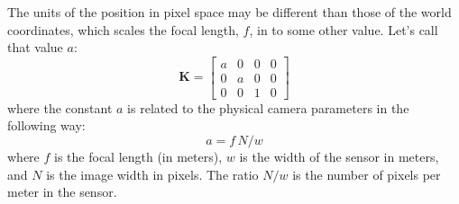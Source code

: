 The units of the position in pixel space may be different than those of the world coordinates, which scales the focal length, $f$, in \eqn{\ref{eq:homogPerspective}} to some other value. Let's call that value $a$:
\begin{equation}
    \mathbf{K} =             
    \begin{bmatrix}
    a & 0 & 0 & 0 \\
    0 & a & 0 & 0 \\
    0 & 0 & 1 & 0
    \end{bmatrix}
    \label{eq:intrinsic}
\end{equation}
where the constant $a$ is related to the physical camera parameters in the following way:
\begin{equation}
a = f \, N / w
\end{equation}
where $f$ is the focal length (in meters), $w$ is the width of the sensor in meters, and $N$ is the image width in pixels. The ratio $N/w$ is the number of pixels per meter in the sensor.

